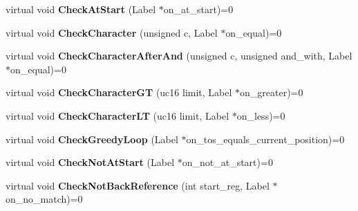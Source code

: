 \begin{DoxyCompactItemize}
\item 
\hypertarget{classv8_1_1internal_1_1_reg_exp_macro_assembler_a5ecd7a813bf293dc9325c65840a2353b}{}virtual void {\bfseries Check\+At\+Start} (Label $\ast$on\+\_\+at\+\_\+start)=0\label{classv8_1_1internal_1_1_reg_exp_macro_assembler_a5ecd7a813bf293dc9325c65840a2353b}

\item 
\hypertarget{classv8_1_1internal_1_1_reg_exp_macro_assembler_a7d8a5cb9434ebe6a748b75bff7849eaa}{}virtual void {\bfseries Check\+Character} (unsigned c, Label $\ast$on\+\_\+equal)=0\label{classv8_1_1internal_1_1_reg_exp_macro_assembler_a7d8a5cb9434ebe6a748b75bff7849eaa}

\item 
\hypertarget{classv8_1_1internal_1_1_reg_exp_macro_assembler_a663101d81689ecee9375b9b2216b827b}{}virtual void {\bfseries Check\+Character\+After\+And} (unsigned c, unsigned and\+\_\+with, Label $\ast$on\+\_\+equal)=0\label{classv8_1_1internal_1_1_reg_exp_macro_assembler_a663101d81689ecee9375b9b2216b827b}

\item 
\hypertarget{classv8_1_1internal_1_1_reg_exp_macro_assembler_a828b95b58f1f3173e5dcbd4268239bde}{}virtual void {\bfseries Check\+Character\+G\+T} (uc16 limit, Label $\ast$on\+\_\+greater)=0\label{classv8_1_1internal_1_1_reg_exp_macro_assembler_a828b95b58f1f3173e5dcbd4268239bde}

\item 
\hypertarget{classv8_1_1internal_1_1_reg_exp_macro_assembler_a6da6588d1142120898c35726d44ba28a}{}virtual void {\bfseries Check\+Character\+L\+T} (uc16 limit, Label $\ast$on\+\_\+less)=0\label{classv8_1_1internal_1_1_reg_exp_macro_assembler_a6da6588d1142120898c35726d44ba28a}

\item 
\hypertarget{classv8_1_1internal_1_1_reg_exp_macro_assembler_abc266b4989f0c084987f50f20f1f3e23}{}virtual void {\bfseries Check\+Greedy\+Loop} (Label $\ast$on\+\_\+tos\+\_\+equals\+\_\+current\+\_\+position)=0\label{classv8_1_1internal_1_1_reg_exp_macro_assembler_abc266b4989f0c084987f50f20f1f3e23}

\item 
\hypertarget{classv8_1_1internal_1_1_reg_exp_macro_assembler_afc0cd1bacec6d0aa1fb28deb684517ff}{}virtual void {\bfseries Check\+Not\+At\+Start} (Label $\ast$on\+\_\+not\+\_\+at\+\_\+start)=0\label{classv8_1_1internal_1_1_reg_exp_macro_assembler_afc0cd1bacec6d0aa1fb28deb684517ff}

\item 
\hypertarget{classv8_1_1internal_1_1_reg_exp_macro_assembler_a6fdfeaaa523306400edf911bea61ce4c}{}virtual void {\bfseries Check\+Not\+Back\+Reference} (int start\+\_\+reg, Label $\ast$on\+\_\+no\+\_\+match)=0\label{classv8_1_1internal_1_1_reg_exp_macro_assembler_a6fdfeaaa523306400edf911bea61ce4c}


\end{DoxyCompactItemize}
